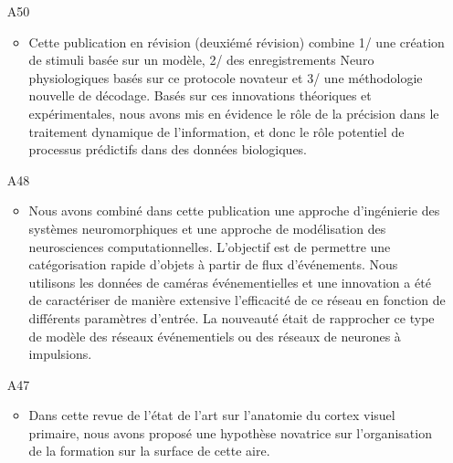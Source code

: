 \begin{enumerate}
%

\item[A50] %
\begin{itemize}
  \item Cette publication en révision (deuxiémé révision) combine 1/ une création de stimuli basée sur un modèle, 2/ des enregistrements Neuro physiologiques basés sur ce protocole novateur et 3/ une méthodologie nouvelle de décodage. Basés sur ces innovations théoriques et expérimentales, nous avons mis en évidence le rôle de la précision dans le traitement dynamique de l'information, et donc le rôle potentiel de processus prédictifs dans des données biologiques.
\end{itemize}

\item[A48] %
\begin{itemize}
  \item Nous avons combiné dans cette publication une approche d'ingénierie des systèmes neuromorphiques et une approche de modélisation des neurosciences computationnelles. L'objectif est de permettre une catégorisation rapide d'objets à partir de flux d'événements. Nous utilisons les données de caméras événementielles et une innovation a été de caractériser de manière extensive l'efficacité de ce réseau en fonction de différents paramètres d'entrée. La nouveauté était de rapprocher ce type de modèle des réseaux événementiels ou des réseaux de neurones à impulsions.
\end{itemize}

%
%

\item[A47] %
%
\begin{itemize}
  \item Dans cette revue de l'état de l'art sur l'anatomie du cortex visuel primaire, nous avons proposé une hypothèse novatrice sur l'organisation de la formation sur la surface de cette aire.
\end{itemize}


\end{enumerate}
